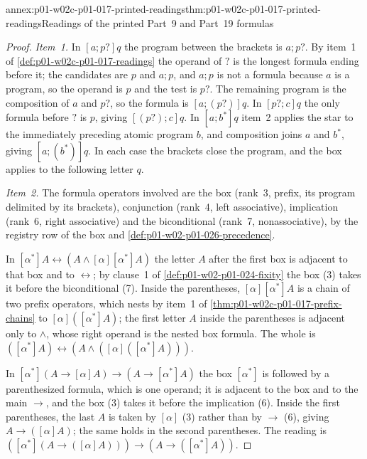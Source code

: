 \begin{annexitem}{annex:p01-w02c-p01-017-printed-readings}{thm:p01-w02c-p01-017-printed-readings}{Readings of the printed Part~9 and Part~19 formulas}
\begin{proof}
\emph{Item~1.}  In \([a;p?]q\) the program between the brackets is
\(a;p?\).  By item~1 of \cref{def:p01-w02c-p01-017-readings} the operand
of \(?\) is the longest formula ending before it; the candidates are
\(p\) and \(a;p\), and \(a;p\) is not a formula because \(a\) is a
program, so the operand is \(p\) and the test is \(p?\).  The remaining
program is the composition of \(a\) and \(p?\), so the formula is
\([a;(p?)]q\).  In \([p?;c]q\) the only formula before \(?\) is \(p\),
giving \([(p?);c]q\).  In \([a;b^{*}]q\) item~2 applies the star to the
immediately preceding atomic program \(b\), and composition joins \(a\)
and \(b^{*}\), giving \([a;(b^{*})]q\).  In each case the brackets close
the program, and the box applies to the following letter \(q\).

\emph{Item~2.}  The formula operators involved are the box (rank~3,
prefix, its program delimited by its brackets), conjunction (rank~4, left
associative), implication (rank~6, right associative) and the
biconditional (rank~7, nonassociative), by the registry row of the box
and \cref{def:p01-w02-p01-026-precedence}.

In \([\alpha^{*}]A\leftrightarrow(A\land[\alpha][\alpha^{*}]A)\) the
letter \(A\) after the first box is adjacent to that box and to
\(\leftrightarrow\); by clause~1 of \cref{def:p01-w02-p01-024-fixity}
the box (3) takes it before the biconditional (7).  Inside the
parentheses, \([\alpha][\alpha^{*}]A\) is a chain of two prefix
operators, which nests by item~1 of
\cref{thm:p01-w02c-p01-017-prefix-chains} to
\([\alpha]([\alpha^{*}]A)\); the first letter \(A\) inside the
parentheses is adjacent only to \(\land\), whose right operand is the
nested box formula.  The whole is
\(([\alpha^{*}]A)\leftrightarrow(A\land([\alpha]([\alpha^{*}]A)))\).

In \([\alpha^{*}](A\to[\alpha]A)\to(A\to[\alpha^{*}]A)\) the box
\([\alpha^{*}]\) is followed by a parenthesized formula, which is one
operand; it is adjacent to the box and to the main \(\to\), and the box
(3) takes it before the implication (6).  Inside the first parentheses,
the last \(A\) is taken by \([\alpha]\) (3) rather than by \(\to\) (6),
giving \(A\to([\alpha]A)\); the same holds in the second parentheses.
The reading is \(([\alpha^{*}](A\to([\alpha]A)))\to(A\to([\alpha^{*}]A))\).


\end{proof}
\end{annexitem}
